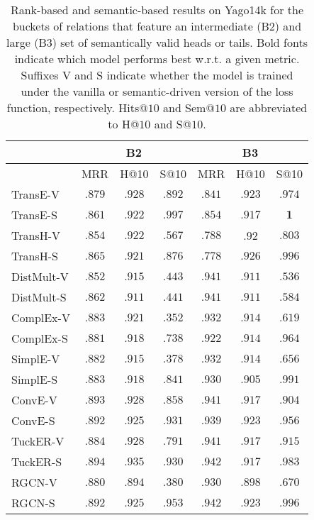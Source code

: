 \documentclass[letterpaper]{article} %
\begin{document}
\begin{table*}[h]
    \caption{Rank-based and semantic-based results on Yago14k for the buckets of relations that feature an intermediate (B2) and large (B3) set of semantically valid heads or tails. Bold fonts indicate which model performs best w.r.t. a given metric. Suffixes V and S indicate whether the model is trained under the vanilla or semantic-driven version of the loss function, respectively. Hits@$10$ and Sem@$10$ are abbreviated to H@$10$ and S@$10$.}
    \centering
    \small
    \setlength{\tabcolsep}{.25cm}
    \begin{tabular}{lcccccc}
    \hline
    &\multicolumn{3}{c}{B2} & \multicolumn{3}{c}{B3}
                    \\\hline
                    & MRR & H@10 & S@10 &
                    MRR & H@10 & S@10 \\
\hline
				TransE-V&$\mathbf{.879}$&$\mathbf{.928}$&$.892$&$.841$&$\mathbf{.923}$&$.974$\\
                    TransE-S &$.861$&$.922$&$\mathbf{.997}$&$\mathbf{.854}$&$.917$&$\mathbf{1}$ \\
    \hline
                    TransH-V &$.854$&$\mathbf{.922}$&$.567$&$\mathbf{.788}$&.92&$.803$ \\
                    TransH-S &$\mathbf{.865}$&$.921$&$\mathbf{.876}$&$.778$&$\mathbf{.926}$&$\mathbf{.996}$ \\
    \hline
                    DistMult-V &$.852$&$\mathbf{.915}$&$\mathbf{.443}$&$.941$&$.911$&$.536$ \\
				DistMult-S &$\mathbf{.862}$&$.911$&$.441$&$.941$&$.911$&$\mathbf{.584}$ \\
    \hline
    ComplEx-V &$\mathbf{.883}$&$\mathbf{.921}$&$.352$&$\mathbf{.932}$&$\mathbf{.914}$&$.619$ \\
    			ComplEx-S &$.881$&$.918$&$\mathbf{.738}$&$.922$&$.914$&$\mathbf{.964}$ \\
    \hline
                    SimplE-V &$.882$&$.915$&$.378$&$\mathbf{.932}$&$\mathbf{.914}$&$.656$ \\
                    SimplE-S &$\mathbf{.883}$&$\mathbf{.918}$&$\mathbf{.841}$&$.930$&$.905$&$\mathbf{.991}$ \\
    \hline
				ConvE-V &$\mathbf{.893}$&$\mathbf{.928}$&$.858$&$\mathbf{.941}$&$.917$&$.904$ \\
				ConvE-S&$.892$&$.925$&$\mathbf{.931}$&$.939$&$\mathbf{.923}$&$\mathbf{.956}$  \\
    \hline
    			TuckER-V &$.884$&$.928$&$.791$&$.941$&$.917$&$.915$ \\
                   TuckER-S &$\mathbf{.894}$&$\mathbf{.935}$&$\mathbf{.930}$&$\mathbf{.942}$&$.917$&$\mathbf{.983}$ \\
    \hline
                    RGCN-V &$.880$&$.894$&$.380$&$.930$&$.898$&$.670$ \\
                    RGCN-S &$\mathbf{.892}$&$\mathbf{.925}$&$\mathbf{.953}$&$\mathbf{.942}$&$\mathbf{.923}$&$\mathbf{.996}$ \\
    \hline
    \end{tabular}
    \label{tab:yago}
\end{table*}


\clearpage


%
\end{document}

